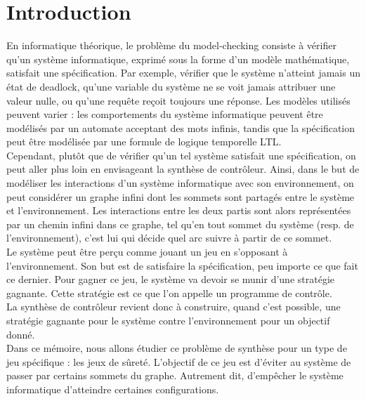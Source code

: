 \documentclass[12pt,a4paper,oneside,titlepage]{report}
\begin{document}

{}
\renewcommand{\leftmark}{TABLE DES MATI\`{E}RES}
\thispagestyle{fancy}
\tableofcontents


\newpage
{}
\renewcommand{\leftmark}{INTRODUCTION}
\chapter{Introduction}
En informatique théorique, le problème du model-checking consiste à vérifier qu'un système informatique, exprimé sous la forme d'un modèle mathématique, satisfait une spécification. Par exemple, vérifier que le système n'atteint jamais un état de deadlock, qu'une variable du système ne se voit jamais attribuer une valeur nulle, ou qu'une requête reçoit toujours une réponse. Les modèles utilisés peuvent varier : les comportements du système informatique peuvent être modélisés par un automate acceptant des mots infinis, tandis que la spécification peut être modélisée par une formule de logique temporelle LTL.\\
Cependant, plutôt que de vérifier qu'un tel système satisfait une spécification, on peut aller plus loin en envisageant la synthèse de contrôleur. Ainsi, dans le but de modéliser les interactions d'un système informatique avec son environnement, on peut considérer un graphe infini dont les sommets sont partagés entre le système et l'environnement. Les interactions entre les deux partis sont alors représentées par un chemin infini dans ce graphe, tel qu'en tout sommet du système (resp. de l'environnement), c'est lui qui décide quel arc suivre à partir de ce sommet.\\
Le système peut être perçu comme jouant un jeu en s'opposant à l'environnement. Son but est de satisfaire la spécification, peu importe ce que fait ce dernier. Pour gagner ce jeu, le système va devoir se munir d'une stratégie gagnante. Cette stratégie est ce que l'on appelle un programme de contrôle.\\
La synthèse de contrôleur revient donc à construire, quand c'est possible, une stratégie gagnante pour le système contre l'environnement pour un objectif donné.\\

\noindent Dans ce mémoire, nous allons étudier ce problème de synthèse pour un type de jeu spécifique : les jeux de sûreté. L'objectif de ce jeu est d'éviter au système de passer par certains sommets du graphe. Autrement dit, d'empêcher le système informatique d'atteindre certaines configurations.\\
\end{document}
